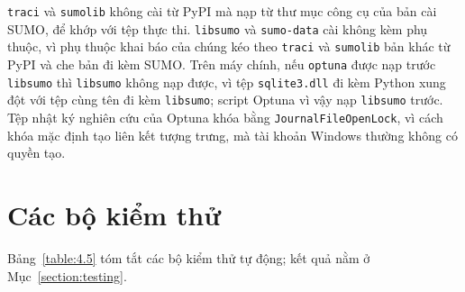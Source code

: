 \documentclass[../main.tex]{subfiles}
\begin{document}
\texttt{traci} và \texttt{sumolib} không cài từ PyPI mà nạp từ thư mục công cụ của bản cài SUMO, để khớp với tệp thực thi. \texttt{libsumo} và \texttt{sumo-data} cài không kèm phụ thuộc, vì phụ thuộc khai báo của chúng kéo theo \texttt{traci} và \texttt{sumolib} bản khác từ PyPI và che bản đi kèm SUMO. Trên máy chính, nếu \texttt{optuna} được nạp trước \texttt{libsumo} thì \texttt{libsumo} không nạp được, vì tệp \texttt{sqlite3.dll} đi kèm Python xung đột với tệp cùng tên đi kèm \texttt{libsumo}; script Optuna vì vậy nạp \texttt{libsumo} trước. Tệp nhật ký nghiên cứu của Optuna khóa bằng \texttt{JournalFileOpenLock}, vì cách khóa mặc định tạo liên kết tượng trưng, mà tài khoản Windows thường không có quyền tạo.

\section{Các bộ kiểm thử}

Bảng~\ref{table:4.5} tóm tắt các bộ kiểm thử tự động; kết quả nằm ở Mục~\ref{section:testing}.
\end{document}
